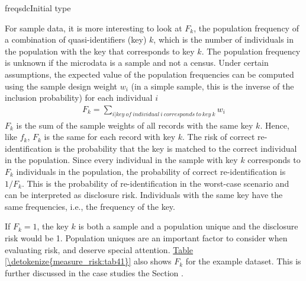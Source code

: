 \documentclass[letterpaper,10pt,english]{sphinxmanual}
\begin{document}
\def\sphinxLiteralBlockLabel{\label{\detokenize{measure_risk:code41}}}
%
\begin{sphinxVerbatim}[commandchars=\\\{\},numbers=left,firstnumber=1,stepnumber=1]
 freqsdcInitial type  
          
\end{sphinxVerbatim}

For sample data, it is more interesting to look at \(F_{k}\), the
population frequency of a combination of quasi-identifiers (key)
\(k\), which is the number of individuals in the population with the
key that corresponds to key \(k\). The population frequency
is unknown if the microdata is a sample and not a census. Under certain
assumptions, the expected value of the population frequencies can be
computed using the sample design weight \(w_{i}\) (in a simple
sample, this is the inverse of the inclusion probability) for each
individual \(i\)
\begin{equation*}
\begin{split}F_{k} = \sum_{i|key\ of\ individual\ i\ corresponds\ to\ key\ k}^{}w_{i}\end{split}
\end{equation*}
\(F_{k}\) is the sum of the sample weights of all records with the
same key \(k\). Hence, like \(f_{k}\), \(F_{k}\) is the same for
each record with key \(k\). The risk of correct re-identification is the
probability that the key is matched to the correct individual in the
population. Since every individual in the sample with key \(k\)
corresponds to \(F_{k}\) individuals in the population, the
probability of correct re-identification is \(1/F_{k}\). This is
the probability of re-identification in the worst-case scenario and can
be interpreted as disclosure risk. Individuals with the same key have
the same frequencies, i.e., the frequency of the key.

If \(F_{k} = 1\), the key \(k\) is both a sample and a
population unique and the disclosure risk would be 1. Population uniques
are an important factor to consider when evaluating risk, and deserve
special attention. \hyperref[\detokenize{measure_risk:tab41}]{Table \ref{\detokenize{measure_risk:tab41}}} also shows \(F_{k}\) for the example
dataset. This is further discussed in the case studies the Section
.
\end{document}
